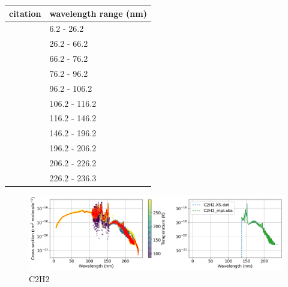 \documentclass[11pt]{article}
\begin{document}
\begin{table}
\centering
\begin{tabular}{ll}
\hline
 citation             & wavelength range (nm)   \\
\hline
 \cite{Cooper_1995}   & 6.2 - 26.2              \\
 \cite{Wu_1985}       & 26.2 - 66.2             \\
 \cite{Metzger_1964}  & 66.2 - 76.2             \\
 \cite{Han_1989}      & 76.2 - 96.2             \\
 \cite{Walker_1955}   & 96.2 - 106.2            \\
 \cite{Nakayama_1964} & 106.2 - 116.2           \\
 \cite{Cheng_2011}    & 116.2 - 146.2           \\
 \cite{Smith_1991}    & 146.2 - 196.2           \\
 \cite{Wu_1989}       & 196.2 - 206.2           \\
 \cite{Chen_1991}     & 206.2 - 226.2           \\
 \cite{B_nilan_2000}  & 226.2 - 236.3           \\
\hline
\end{tabular}
\end{table}



\begin{figure}
\centering
\includegraphics[width=\textwidth]{C2H2.png}
\caption{C2H2}
\label{fig:C2H2}
\end{figure}




\end{document}
